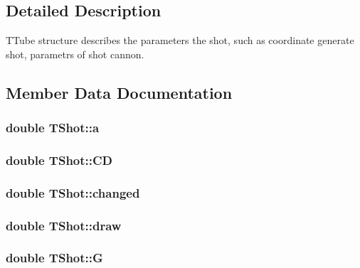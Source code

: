 \subsection{Detailed Description}
T\+Tube structure describes the parameters the shot, such as coordinate generate shot, parametrs of shot cannon. 

\subsection{Member Data Documentation}
\subsubsection[{\texorpdfstring{a}{a}}]{\setlength{\rightskip}{0pt plus 5cm}double T\+Shot\+::a}\hypertarget{struct_t_shot_a15a6a1f4d0e4fa8d2922746d3718c645}{}\label{struct_t_shot_a15a6a1f4d0e4fa8d2922746d3718c645}
\subsubsection[{\texorpdfstring{CD}{CD}}]{\setlength{\rightskip}{0pt plus 5cm}double T\+Shot\+::\+CD}\hypertarget{struct_t_shot_a0b8bd704b499d9e24249e5c35e526fc4}{}\label{struct_t_shot_a0b8bd704b499d9e24249e5c35e526fc4}
\subsubsection[{\texorpdfstring{changed}{changed}}]{\setlength{\rightskip}{0pt plus 5cm}double T\+Shot\+::changed}\hypertarget{struct_t_shot_ac06afbb79a97feeef328bd6e985105ae}{}\label{struct_t_shot_ac06afbb79a97feeef328bd6e985105ae}
\subsubsection[{\texorpdfstring{draw}{draw}}]{\setlength{\rightskip}{0pt plus 5cm}double T\+Shot\+::draw}\hypertarget{struct_t_shot_aec72c87adc6f131dc80d154480edf585}{}\label{struct_t_shot_aec72c87adc6f131dc80d154480edf585}
\subsubsection[{\texorpdfstring{G}{G}}]{\setlength{\rightskip}{0pt plus 5cm}double T\+Shot\+::G}\hypertarget{struct_t_shot_aca3a4d1732cb311375e514137d8ddae2}{}\label{struct_t_shot_aca3a4d1732cb311375e514137d8ddae2}

